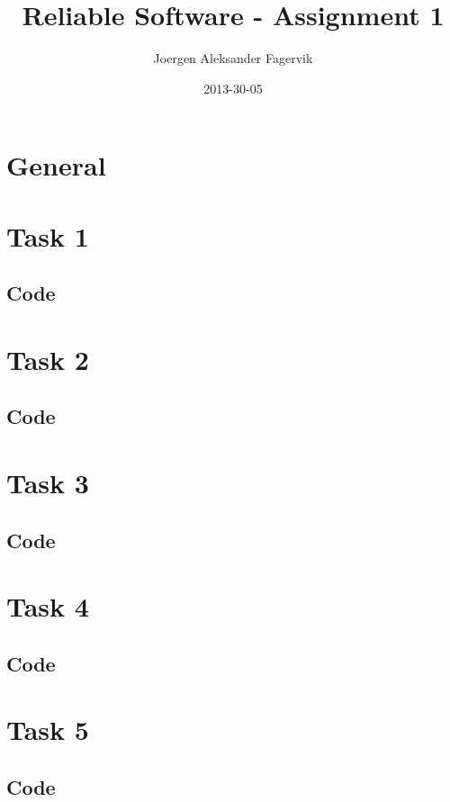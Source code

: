 \documentclass{article}
\title{Reliable Software - Assignment 1}
\date{2013-30-05}
\author{Joergen Aleksander Fagervik}
\begin{document}
  \maketitle
  \newpage

\section{General}

\section{Task 1}

\subsection{Code}



\section{Task 2}

\subsection{Code}



\section{Task 3}

\subsection{Code}



\section{Task 4}

\subsection{Code}



\section{Task 5}

\subsection{Code}


\end{document}
